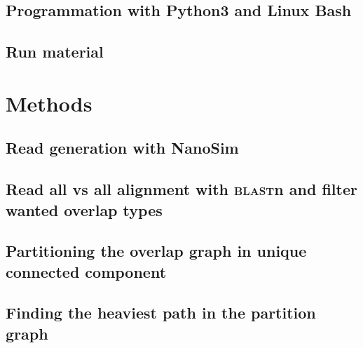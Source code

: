 \subsection{Programmation with Python3 and Linux Bash}

\subsection{Run material}

\section{Methods}

\subsection{Read generation with NanoSim}

\subsection{Read all vs all alignment with \textsc{blast}n and filter wanted overlap types}

\subsection{Partitioning the overlap graph in unique connected component}

\subsection{Finding the heaviest path in the partition graph}

